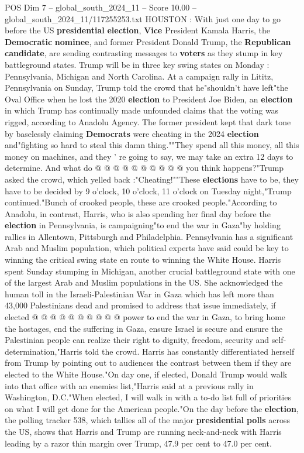 \begin{textsample}{POS Dim 7 – global\_south\_2024\_11 – Score 10.00 – global\_south\_2024\_11/117255253.txt}  \label{ex:f7_pos_143}
HOUSTON : With just one day to go before the US \textbf{presidential} \textbf{election}, \textbf{Vice} President Kamala Harris, the \textbf{Democratic} \textbf{nominee}, and former President Donald Trump, the \textbf{Republican} \textbf{candidate}, are sending contrasting messages to \textbf{voters} as they stump in key battleground states.
Trump will be in three key swing states on Monday : Pennsylvania, Michigan and North Carolina.
At a campaign rally in Lititz, Pennsylvania on Sunday, Trump told the crowd that he"shouldn't have left"the Oval Office when he lost the 2020 \textbf{election} to President Joe Biden, an \textbf{election} in which Trump has continually made unfounded claims that the voting was rigged, according to Anadolu Agency.
The former president kept that dark tone by baselessly claiming \textbf{Democrats} were cheating in the 2024 \textbf{election} and"fighting so hard to steal this damn thing.""They spend all this money, all this money on machines, and they ' re going to say, we may take an extra 12 days to determine.
And what do @ @ @ @ @ @ @ @ @ @ you think happens?"Trump asked the crowd, which yelled back :"Cheating!""These \textbf{elections} have to be, they have to be decided by 9 o'clock, 10 o'clock, 11 o'clock on Tuesday night,"Trump continued."Bunch of crooked people, these are crooked people."According to Anadolu, in contrast, Harris, who is also spending her final day before the \textbf{election} in Pennsylvania, is campaigning"to end the war in Gaza"by holding rallies in Allentown, Pittsburgh and Philadelphia.
Pennsylvania has a significant Arab and Muslim population, which political experts have said could be key to winning the critical swing state en route to winning the White House.
Harris spent Sunday stumping in Michigan, another crucial battleground state with one of the largest Arab and Muslim populations in the US.
She acknowledged the human toll in the Israeli-Palestinian War in Gaza which has left more than 43,000 Palestinians dead and promised to address that issue immediately, if elected @ @ @ @ @ @ @ @ @ @ power to end the war in Gaza, to bring home the hostages, end the suffering in Gaza, ensure Israel is secure and ensure the Palestinian people can realize their right to dignity, freedom, security and self-determination,"Harris told the crowd.
Harris has constantly differentiated herself from Trump by pointing out to audiences the contrast between them if they are elected to the White House."On day one, if elected, Donald Trump would walk into that office with an enemies list,"Harris said at a previous rally in Washington, D.C."When elected, I will walk in with a to-do list full of priorities on what I will get done for the American people."On the day before the \textbf{election}, the polling tracker 538, which tallies all of the major \textbf{presidential} \textbf{polls} across the US, shows that Harris and Trump are running neck-and-neck with Harris leading by a razor thin margin over Trump, 47.9 per cent to 47.0 per cent.

\end{textsample}

